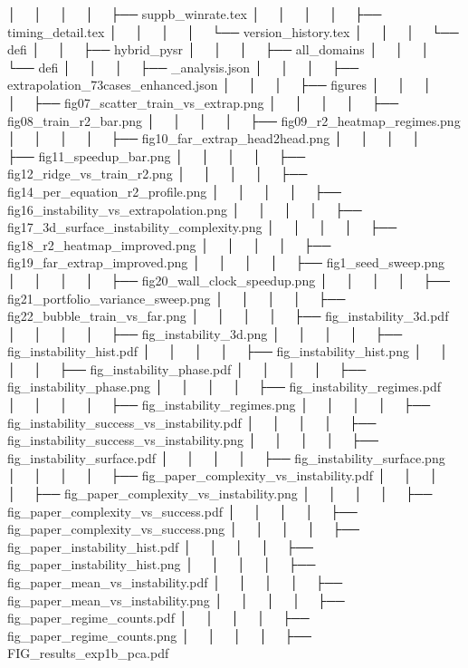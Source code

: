 │   │       │   │       ├── suppb_winrate.tex
│   │       │   │       ├── timing_detail.tex
│   │       │   │       └── version_history.tex
│   │       │   └── defi
│   │       ├── hybrid_pysr
│   │       │   ├── all_domains
│   │       │   └── defi
│   │       │       ├── _analysis.json
│   │       │       ├── extrapolation_73cases_enhanced.json
│   │       │       ├── figures
│   │       │       │   ├── fig07_scatter_train_vs_extrap.png
│   │       │       │   ├── fig08_train_r2_bar.png
│   │       │       │   ├── fig09_r2_heatmap_regimes.png
│   │       │       │   ├── fig10_far_extrap_head2head.png
│   │       │       │   ├── fig11_speedup_bar.png
│   │       │       │   ├── fig12_ridge_vs_train_r2.png
│   │       │       │   ├── fig14_per_equation_r2_profile.png
│   │       │       │   ├── fig16_instability_vs_extrapolation.png
│   │       │       │   ├── fig17_3d_surface_instability_complexity.png
│   │       │       │   ├── fig18_r2_heatmap_improved.png
│   │       │       │   ├── fig19_far_extrap_improved.png
│   │       │       │   ├── fig1_seed_sweep.png
│   │       │       │   ├── fig20_wall_clock_speedup.png
│   │       │       │   ├── fig21_portfolio_variance_sweep.png
│   │       │       │   ├── fig22_bubble_train_vs_far.png
│   │       │       │   ├── fig_instability_3d.pdf
│   │       │       │   ├── fig_instability_3d.png
│   │       │       │   ├── fig_instability_hist.pdf
│   │       │       │   ├── fig_instability_hist.png
│   │       │       │   ├── fig_instability_phase.pdf
│   │       │       │   ├── fig_instability_phase.png
│   │       │       │   ├── fig_instability_regimes.pdf
│   │       │       │   ├── fig_instability_regimes.png
│   │       │       │   ├── fig_instability_success_vs_instability.pdf
│   │       │       │   ├── fig_instability_success_vs_instability.png
│   │       │       │   ├── fig_instability_surface.pdf
│   │       │       │   ├── fig_instability_surface.png
│   │       │       │   ├── fig_paper_complexity_vs_instability.pdf
│   │       │       │   ├── fig_paper_complexity_vs_instability.png
│   │       │       │   ├── fig_paper_complexity_vs_success.pdf
│   │       │       │   ├── fig_paper_complexity_vs_success.png
│   │       │       │   ├── fig_paper_instability_hist.pdf
│   │       │       │   ├── fig_paper_instability_hist.png
│   │       │       │   ├── fig_paper_mean_vs_instability.pdf
│   │       │       │   ├── fig_paper_mean_vs_instability.png
│   │       │       │   ├── fig_paper_regime_counts.pdf
│   │       │       │   ├── fig_paper_regime_counts.png
│   │       │       │   ├── FIG_results_exp1b_pca.pdf
